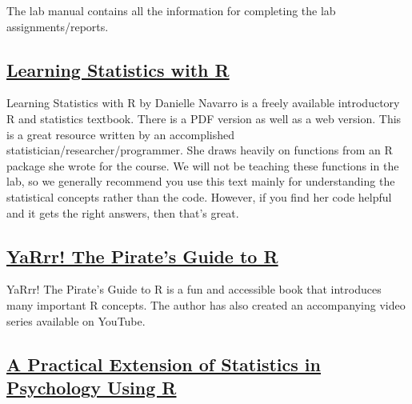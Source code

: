 \documentclass[
]{book}
\begin{document}
The lab manual contains all the information for completing the lab assignments/reports.

\hypertarget{learning-statistics-with-r}{%
\subsection*{\texorpdfstring{\href{https://learningstatisticswithr.com/}{Learning Statistics with R}}{Learning Statistics with R}}\label{learning-statistics-with-r}}

Learning Statistics with R by Danielle Navarro is a freely available introductory R and statistics textbook. There is a PDF version as well as a web version. This is a great resource written by an accomplished statistician/researcher/programmer. She draws heavily on functions from an R package she wrote for the course. We will not be teaching these functions in the lab, so we generally recommend you use this text mainly for understanding the statistical concepts rather than the code. However, if you find her code helpful and it gets the right answers, then that's great.

\hypertarget{yarrr-the-pirates-guide-to-r}{%
\subsection*{\texorpdfstring{\href{https://bookdown.org/ndphillips/YaRrr/}{YaRrr! The Pirate's Guide to R}}{YaRrr! The Pirate's Guide to R}}\label{yarrr-the-pirates-guide-to-r}}

YaRrr! The Pirate's Guide to R is a fun and accessible book that introduces many important R concepts. The author has also created an accompanying video series available on YouTube.

\hypertarget{a-practical-extension-of-statistics-in-psychology-using-r}{%
\subsection*{\texorpdfstring{\href{https://rpsystats.com/}{A Practical Extension of Statistics in Psychology Using R}}{A Practical Extension of Statistics in Psychology Using R}}\label{a-practical-extension-of-statistics-in-psychology-using-r}}
\end{document}
